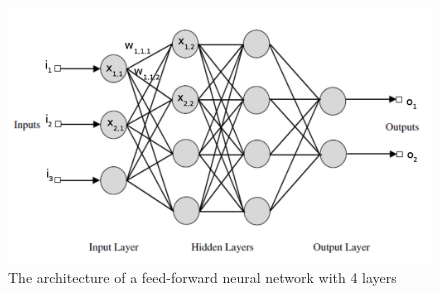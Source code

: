 \begin{figure}
\centering
\includegraphics[scale=0.32]{pictures/ANN}
\caption{The architecture of a feed-forward neural network with 4 layers \cite{natureOfCode}}
\label{fig:ANN}
\end{figure}

